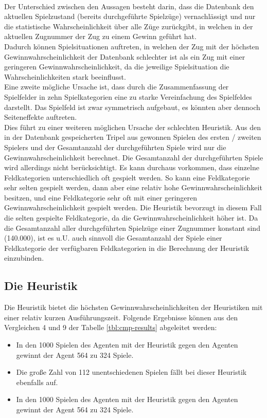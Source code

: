 \\Der Unterschied zwischen den Aussagen besteht darin, dass die Datenbank den aktuellen Spielzustand (bereits durchgeführte Spielzüge) vernachlässigt und nur die statistische Wahrscheinlichkeit über alle Züge zurückgibt, in welchen in der aktuellen Zugnummer der Zug zu einem Gewinn geführt hat.
\\Dadurch können Spielsituationen auftreten, in welchen der Zug mit der höchsten Gewinnwahrscheinlichkeit der Datenbank schlechter ist als ein Zug mit einer geringeren Gewinnwahrscheinlichkeit, da die jeweilige Spielsituation die Wahrscheinlichkeiten stark beeinflusst.
\\Eine zweite mögliche Ursache ist, dass durch die Zusammenfassung der Spielfelder in zehn Spielkategorien eine zu starke Vereinfachung des Spielfeldes darstellt. Das Spielfeld ist zwar symmetrisch aufgebaut, es könnten aber dennoch Seiteneffekte auftreten.
\\Dies führt zu einer weiteren möglichen Ursache der schlechten Heuristik. Aus den in der Datenbank gespeicherten Tripel aus gewonnen Spielen des ersten / zweiten Spielers und der Gesamtanzahl der durchgeführten Spiele wird nur die Gewinnwahrscheinlichkeit berechnet. Die Gesamtanzahl der durchgeführten Spiele wird allerdings nicht berücksichtigt. Es kann durchaus vorkommen, dass einzelne Feldkategorien unterschiedlich oft gespielt werden. So kann eine Feldkategorie sehr selten gespielt werden, dann aber eine relativ hohe Gewinnwahrscheinlichkeit besitzen, und eine Feldkategorie sehr oft mit einer geringeren Gewinnwahrscheinlichkeit gespielt werden. Die Heuristik bevorzugt in diesem Fall die selten gespielte Feldkategorie, da die Gewinnwahrscheinlichkeit höher ist. Da die Gesamtanzahl aller durchgeführten Spielzüge einer Zugnummer konstant sind (140.000), ist es u.U. auch sinnvoll die Gesamtanzahl der Spiele einer Feldkategorie der verfügbaren Feldkategorien in die Berechnung der Heuristik einzubinden.

\subsection{Die Heuristik }
Die  Heuristik bietet die höchsten Gewinnwahrscheinlichkeiten der  Heuristiken mit einer relativ kurzen Ausführungszeit. Folgende Ergebnisse können aus den Vergleichen 4 und 9 der Tabelle \ref{tbl:cmp-results} abgeleitet werden:
\begin{itemize}
\item In den 1000 Spielen des  Agenten mit der  Heuristik gegen den  Agenten gewinnt der  Agent 564 zu 324 Spiele.
\item Die große Zahl von 112 unentschiedenen Spielen fällt bei dieser Heuristik ebenfalls auf.
\item In den 1000 Spielen des  Agenten mit der  Heuristik gegen den  Agenten gewinnt der  Agent 564 zu 324 Spiele.
\end{itemize}

